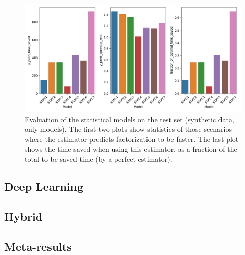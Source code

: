 \begin{figure}[ht]
    \centering
    \includegraphics[width=\linewidth]{chapters/05_cost_estimation/figures/stat-models-compare.pdf}
    \caption[Statistical Model Evaluation]{Evaluation of the statistical models on the test set (synthetic data, only models). The first two plots show statistics of those scenarios where the estimator predicts factorization to be faster. The last plot shows the time saved when using this estimator, as a fraction of the total to-be-saved time (by a perfect estimator).}
    \label{fig:5-statistical-model-evaluation}
\end{figure}

\subsection{Deep Learning}

\subsection{Hybrid}

\subsection{Meta-results}
